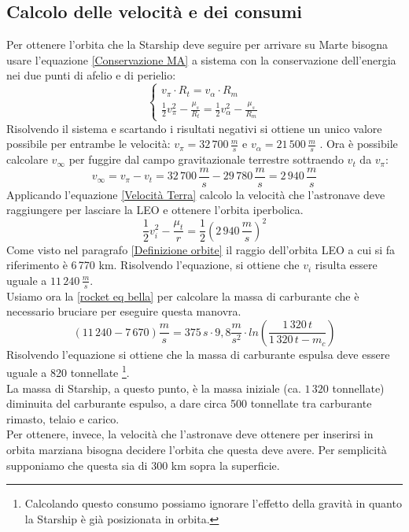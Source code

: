 \subsection{Calcolo delle velocità e dei consumi}
Per ottenere l'orbita che la Starship deve seguire per arrivare su Marte bisogna usare l'equazione \ref{Conservazione MA} a sistema con la conservazione dell'energia nei due punti di afelio e di perielio:
\begin{equation}
    \begin{cases}
        v_\pi \cdot R_t = v_\alpha \cdot R_m\\
        \frac{1}{2}v_\pi^2 - \frac{\mu_s}{R_t} = \frac{1}{2}v_\alpha^2 - \frac{\mu_s}{R_m}
    \end{cases}
\end{equation}
Risolvendo il sistema e scartando i risultati negativi si ottiene un unico valore possibile per entrambe le velocità: $v_\pi = 32\,700\,\frac{m}{s}$ e $v_\alpha = 21\,500
\,\frac{m}{s}$ . Ora è possibile calcolare $v_\infty$ per fuggire dal campo gravitazionale terrestre sottraendo $v_t$ da $v_\pi$:
$$
v_\infty = v_\pi - v_t = 32\,700\, \frac{m}{s} - 29\,780\, \frac{m}{s} = 2\,940\,\frac{m}{s}
$$
Applicando l'equazione \ref{Velocità Terra} calcolo la velocità che l'astronave deve raggiungere per lasciare la LEO e ottenere l'orbita iperbolica.
$$
\frac{1}{2}v_i^2 - \frac{\mu_t}{r} = \frac{1}{2}\left(2\,940\,\frac{m}{s}\right)^2
$$
Come visto nel paragrafo \ref{Definizione orbite} il raggio dell'orbita LEO a cui si fa riferimento è 6\,770 km.
Risolvendo l'equazione, si ottiene che $v_i$ risulta essere uguale a $11\,240\,\frac{m}{s}$.\\
Usiamo ora la \ref{rocket eq bella} per calcolare la massa di carburante che è necessario bruciare per eseguire questa manovra.
$$
(11\,240-7\,670)\frac{m}{s} = 375\,s\cdot9,8\frac{m}{s^2}\cdot ln\left(\frac{1\,320\,t}{1\,320\,t - m_c}\right)
$$
Risolvendo l'equazione si ottiene che la massa di carburante espulsa deve essere uguale a 820 tonnellate \footnote{Calcolando questo consumo possiamo ignorare l'effetto della gravità in quanto la Starship è già posizionata in orbita.}.\\
La massa di Starship, a questo punto, è la massa iniziale (ca. $1\,320$ tonnellate) diminuita del carburante espulso, a dare circa 500 tonnellate tra carburante rimasto, telaio e carico.\\
Per ottenere, invece, la velocità che l'astronave deve ottenere per inserirsi in orbita marziana bisogna decidere l'orbita che questa deve avere. Per semplicità supponiamo che questa sia di 300 km sopra la superficie.\\
